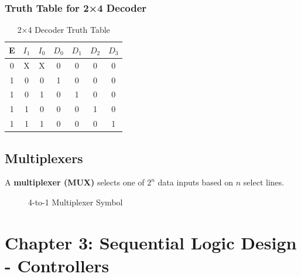 \documentclass[12pt,a4paper]{article}
\begin{document}
\subsubsection{Truth Table for 2×4 Decoder}

\begin{table}[H]
\centering
\begin{tabular}{ccc|cccc}
\toprule
\textbf{E} & \textbf{$I_1$} & \textbf{$I_0$} & \textbf{$D_0$} & \textbf{$D_1$} & \textbf{$D_2$} & \textbf{$D_3$} \\
\midrule
0 & X & X & 0 & 0 & 0 & 0 \\
1 & 0 & 0 & 1 & 0 & 0 & 0 \\
1 & 0 & 1 & 0 & 1 & 0 & 0 \\
1 & 1 & 0 & 0 & 0 & 1 & 0 \\
1 & 1 & 1 & 0 & 0 & 0 & 1 \\
\bottomrule
\end{tabular}
\caption{2×4 Decoder Truth Table}
\end{table}

\subsection{Multiplexers}

A \textbf{multiplexer (MUX)} selects one of $2^n$ data inputs based on $n$ select lines.

\begin{figure}[H]
\centering
{}
\caption{4-to-1 Multiplexer Symbol}
\end{figure}

\newpage
\section{Chapter 3: Sequential Logic Design - Controllers}
\end{document}

